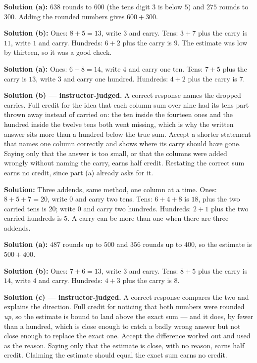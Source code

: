 \documentclass[12pt]{article}
\begin{document}
\textbf{Solution (a):} $638$ rounds to $600$ (the tens digit $3$ is below $5$) and $275$ rounds to $300$. Adding the rounded numbers gives $600 + 300$. 

\textbf{Solution (b):} Ones: $8 + 5 = 13$, write $3$ and carry. Tens: $3 + 7$ plus the carry is $11$, write $1$ and carry. Hundreds: $6 + 2$ plus the carry is $9$. The estimate was low by thirteen, so it was a good check. 


\textbf{Solution (a):} Ones: $6 + 8 = 14$, write $4$ and carry one ten. Tens: $7 + 5$ plus the carry is $13$, write $3$ and carry one hundred. Hundreds: $4 + 2$ plus the carry is $7$. 

\textbf{Solution (b) --- instructor-judged.} A correct response names the dropped carries. Full credit for the idea that each column sum over nine had its tens part thrown away instead of carried on: the ten inside the fourteen ones and the hundred inside the twelve tens both went missing, which is why the written answer sits more than a hundred below the true sum. Accept a shorter statement that names one column correctly and shows where its carry should have gone. Saying only that the answer is too small, or that the columns were added wrongly without naming the carry, earns half credit. Restating the correct sum earns no credit, since part (a) already asks for it.


\textbf{Solution:} Three addends, same method, one column at a time. Ones: $8 + 5 + 7 = 20$, write $0$ and carry two tens. Tens: $6 + 4 + 8$ is $18$, plus the two carried tens is $20$; write $0$ and carry two hundreds. Hundreds: $2 + 1$ plus the two carried hundreds is $5$. A carry can be more than one when there are three addends. 


\textbf{Solution (a):} $487$ rounds up to $500$ and $356$ rounds up to $400$, so the estimate is $500 + 400$. 

\textbf{Solution (b):} Ones: $7 + 6 = 13$, write $3$ and carry. Tens: $8 + 5$ plus the carry is $14$, write $4$ and carry. Hundreds: $4 + 3$ plus the carry is $8$. 

\textbf{Solution (c) --- instructor-judged.} A correct response compares the two and explains the direction. Full credit for noticing that both numbers were rounded \emph{up}, so the estimate is bound to land above the exact sum --- and it does, by fewer than a hundred, which is close enough to catch a badly wrong answer but not close enough to replace the exact one. Accept the difference worked out and used as the reason. Saying only that the estimate is close, with no reason, earns half credit. Claiming the estimate should equal the exact sum earns no credit.
\end{document}

